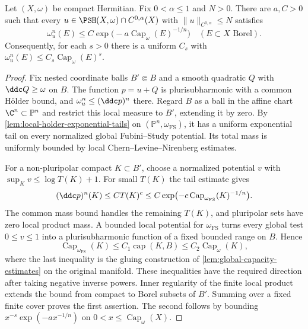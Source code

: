 \begin{proposition}\label{prop:holder-reference-capacity}
Let $(X,\omega)$ be compact Hermitian. Fix $0<\alpha\leq1$ and $N>0$. There are $a,C>0$ such that every $u\in\PSH(X,\omega)\cap C^{0,\alpha}(X)$ with $\|u\|_{C^{0,\alpha}}\leq N$ satisfies
\[
 \omega_u^n(E)\leq C\exp\bigl(-a\operatorname{Cap}_\omega(E)^{-1/n}\bigr)
 \quad(E\subset X\text{ Borel}).
\]
Consequently, for each $s>0$ there is a uniform $C_s$ with $\omega_u^n(E)\leq C_s\operatorname{Cap}_\omega(E)^s$.
\end{proposition}
\begin{proof}
Fix nested coordinate balls $B'\Subset B$ and a smooth quadratic $Q$ with $\ddc Q\geq\omega$ on $B$. The function $p=u+Q$ is plurisubharmonic with a common H\"older bound, and $\omega_u^n\leq(\ddc p)^n$ there. Regard $B$ as a ball in the affine chart $\C^n\subset\mathbb P^n$ and restrict this local measure to $B'$, extending it by zero. By \cref{lem:local-holder-exponential-tails} on $(\mathbb P^n,\omega_{\mathrm{FS}})$, it has a uniform exponential tail on every normalized global Fubini--Study potential. Its total mass is uniformly bounded by local Chern--Levine--Nirenberg estimates.

For a non-pluripolar compact $K\subset B'$, choose a normalized potential $v$ with $\sup_Kv\leq\log T(K)+1$. For small $T(K)$ the tail estimate gives
\[
 (\ddc p)^n(K)\leq C T(K)^c
 \leq C\exp\bigl(-c\operatorname{Cap}_{\omega_{\mathrm{FS}}}(K)^{-1/n}\bigr).
\]
The common mass bound handles the remaining $T(K)$, and pluripolar sets have zero local product mass. A bounded local potential for $\omega_{\mathrm{FS}}$ turns every global test $0\leq v\leq1$ into a plurisubharmonic function of a fixed bounded range on $B$. Hence
\[
 \operatorname{Cap}_{\omega_{\mathrm{FS}}}(K)
 \leq C_1\operatorname{cap}(K,B)
 \leq C_2\operatorname{Cap}_\omega(K),
\]
where the last inequality is the gluing construction of \cref{lem:global-capacity-estimates} on the original manifold. These inequalities have the required direction after taking negative inverse powers. Inner regularity of the finite local product extends the bound from compact to Borel subsets of $B'$. Summing over a fixed finite cover proves the first assertion. The second follows by bounding $x^{-s}\exp(-ax^{-1/n})$ on $0<x\leq\operatorname{Cap}_\omega(X)$.
\end{proof}
